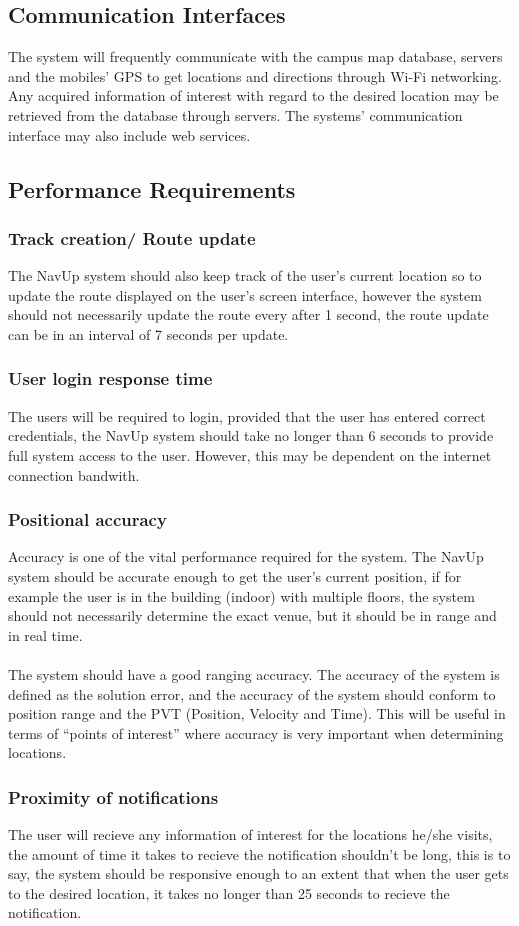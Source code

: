 	\subsection{Communication Interfaces}
The system will frequently communicate with the campus map database, servers and the mobiles’ GPS to get locations and directions through Wi-Fi networking. Any acquired information of interest with regard to the desired location may be retrieved from the database through servers. The systems’ communication interface may also include web services.

\subsection{Performance Requirements}
	\subsubsection{Track creation/ Route update}
	The NavUp system should also keep track of the user's current location
	so to update the route displayed on the user's screen interface, however 
	the system should not necessarily update the route every after 1 second, the 
	route update can be in an interval of 7 seconds per update.
	\subsubsection{User login response time}
	The users will be required to login, provided that the user has
	entered correct credentials, the NavUp system should take no longer
	than 6 seconds to provide full system access to the user. However, this
	may be dependent on the internet connection bandwith.
	\subsubsection{Positional accuracy}
	Accuracy is one of the vital performance required for the system. The NavUp 
	system should be accurate enough to get the user’s current position, if for 
	example the user is in the building (indoor) with multiple floors, the system 
	should not necessarily determine the exact venue, but it should be in range and 
	in real time.\\\\ The system should have a good ranging accuracy. The accuracy of the 
	system is defined as the solution error, and the accuracy of the system should conform 
	to position range and the PVT (Position, Velocity and Time). This will be useful in 
	terms of “points of interest” where accuracy is very important when determining locations.
	\subsubsection{Proximity of notifications}
	The user will recieve any information of interest for the locations he/she visits, the amount
	of time it takes to recieve the notification shouldn't be long, this is to say, the system should 
	be responsive enough to an extent that when the user gets to the desired location, it takes no longer 
	than 25 seconds to recieve the notification.

